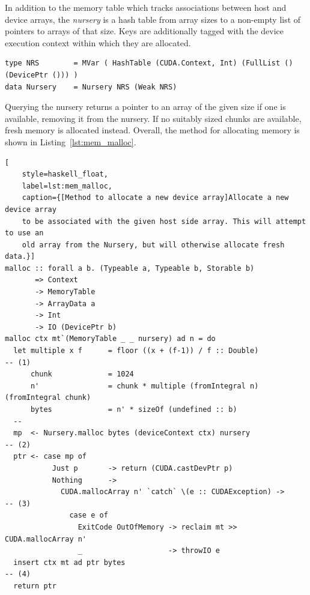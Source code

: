 In addition to the memory table which tracks associations between host and
device arrays, the \emph{nursery} is a hash table from array sizes to a
non-empty list of pointers to arrays of that size. Keys are additionally tagged
with the device execution context within which they are allocated.
%
\begin{lstlisting}[style=haskell]
type NRS        = MVar ( HashTable (CUDA.Context, Int) (FullList () (DevicePtr ())) )
data Nursery    = Nursery NRS (Weak NRS)
\end{lstlisting}
%
Querying the nursery returns a pointer to an array of the given size if one is
available, removing it from the nursery. If no suitably sized chunks are
available, fresh memory is allocated instead. Overall, the method for allocating
memory is shown in Listing~\ref{lst:mem_malloc}.
%
\begin{lstlisting}[
    style=haskell_float,
    label=lst:mem_malloc,
    caption={[Method to allocate a new device array]Allocate a new device array
    to be associated with the given host side array. This will attempt to use an
    old array from the Nursery, but will otherwise allocate fresh data.}]
malloc :: forall a b. (Typeable a, Typeable b, Storable b)
       => Context
       -> MemoryTable
       -> ArrayData a
       -> Int
       -> IO (DevicePtr b)
malloc ctx mt`(MemoryTable _ _ nursery) ad n = do
  let multiple x f      = floor ((x + (f-1)) / f :: Double)                            -- (1)
      chunk             = 1024
      n'                = chunk * multiple (fromIntegral n) (fromIntegral chunk)
      bytes             = n' * sizeOf (undefined :: b)
  --
  mp  <- Nursery.malloc bytes (deviceContext ctx) nursery                              -- (2)
  ptr <- case mp of
           Just p       -> return (CUDA.castDevPtr p)
           Nothing      ->
             CUDA.mallocArray n' `catch` \(e :: CUDAException) ->                      -- (3)
               case e of
                 ExitCode OutOfMemory -> reclaim mt >> CUDA.mallocArray n'
                 _                    -> throwIO e
  insert ctx mt ad ptr bytes                                                           -- (4)
  return ptr
\end{lstlisting}
%
